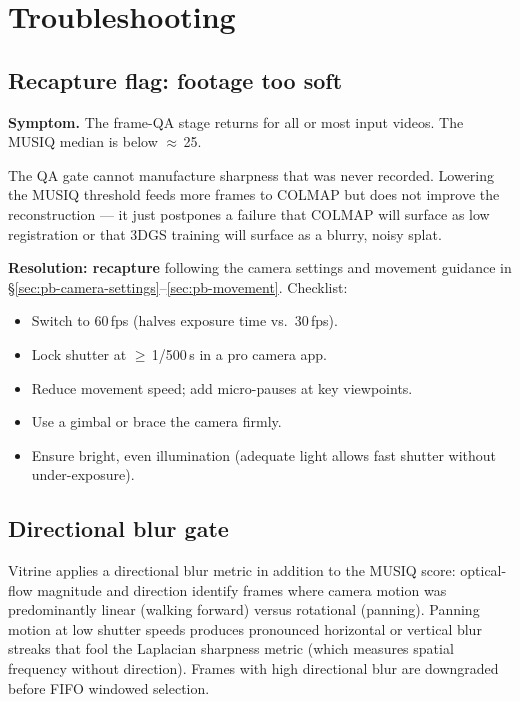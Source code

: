 \section{Troubleshooting}
\label{sec:pb-troubleshoot}

\subsection{Recapture flag: footage too soft}
\label{sec:pb-ts-recapture}

\begin{technote}
\textbf{Symptom.}  The frame-QA stage returns  for all
or most input videos.  The MUSIQ median is below $\approx$\,25.
\end{technote}

The QA gate cannot manufacture sharpness that was never recorded.  Lowering
the MUSIQ threshold feeds more frames to COLMAP but does not improve the
reconstruction --- it just postpones a failure that COLMAP will surface as low
registration or that 3DGS training will surface as a blurry, noisy splat.

\textbf{Resolution: recapture} following the camera settings and movement
guidance in \S\ref{sec:pb-camera-settings}--\ref{sec:pb-movement}.  Checklist:
\begin{itemize}[nosep]
  \item Switch to 60\,fps (halves exposure time vs.\ 30\,fps).
  \item Lock shutter at $\geq$\,1/500\,s in a pro camera app.
  \item Reduce movement speed; add micro-pauses at key viewpoints.
  \item Use a gimbal or brace the camera firmly.
  \item Ensure bright, even illumination (adequate light allows fast shutter
        without under-exposure).
\end{itemize}

\subsection{Directional blur gate}
\label{sec:pb-ts-blur-gate}

Vitrine applies a directional blur metric in addition to the MUSIQ score:
optical-flow magnitude and direction identify frames where camera motion was
predominantly linear (walking forward) versus rotational (panning).  Panning
motion at low shutter speeds produces pronounced horizontal or vertical blur
streaks that fool the Laplacian sharpness metric (which measures spatial
frequency without direction).  Frames with high directional blur are downgraded
before FIFO windowed selection.

